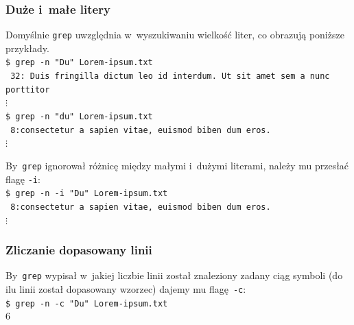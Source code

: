 \documentclass[10pt,t]{beamer}
\begin{document}
\begin{frame}
  \frametitle{Duże i~małe litery}


  Domyślnie \texttt{grep} uwzględnia w~wyszukiwaniu wielkość liter, co
  obrazują poniższe przykłady. \\
  \texttt{\$ grep -n "Du"{} Lorem-ipsum.txt} \\
  \texttt{{\color{green} 32:}{\color{red} Du}is fringilla dictum leo id
    interdum. Ut sit amet sem a nunc porttitor} \\
  \hspace{1em} $\vdots$ \\
  \texttt{\$ grep -n "du"{} Lorem-ipsum.txt} \\
  \texttt{{\color{green} 8:}consectetur a sapien vitae, euismod
    biben{\color{red} du}m eros.} \\
  \hspace{1em} $\vdots$

  By~\texttt{grep} ignorował różnicę między małymi i~dużymi literami,
  należy mu przesłać flagę \texttt{-i}: \\
  \texttt{\$ grep -n -i "Du"{} Lorem-ipsum.txt} \\
  \texttt{{\color{green} 8:}consectetur a sapien vitae, euismod
    biben{\color{red} du}m eros.} \\
  \hspace{1em} $\vdots$

\end{frame}





\begin{frame}
  \frametitle{Zliczanie dopasowany linii}


  By~\texttt{grep} wypisał w~jakiej liczbie linii został znaleziony zadany
  ciąg symboli (do ilu linii został dopasowany wzorzec) dajemy mu
  flagę~\texttt{-c}: \\
  \texttt{\$ grep -n -c "Du"{} Lorem-ipsum.txt} \\
  \texttt{$6$}

\end{frame}









\end{document}
